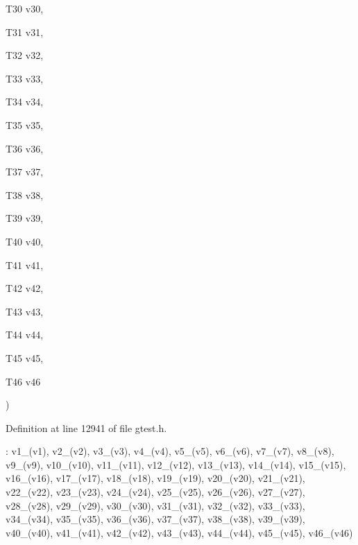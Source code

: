 {{\begin{DoxyParamCaption}
\item[{\-T30}]{v30, }
\item[{\-T31}]{v31, }
\item[{\-T32}]{v32, }
\item[{\-T33}]{v33, }
\item[{\-T34}]{v34, }
\item[{\-T35}]{v35, }
\item[{\-T36}]{v36, }
\item[{\-T37}]{v37, }
\item[{\-T38}]{v38, }
\item[{\-T39}]{v39, }
\item[{\-T40}]{v40, }
\item[{\-T41}]{v41, }
\item[{\-T42}]{v42, }
\item[{\-T43}]{v43, }
\item[{\-T44}]{v44, }
\item[{\-T45}]{v45, }
\item[{\-T46}]{v46}
\end{DoxyParamCaption}
)}}\label{d5/dac/classtesting_1_1internal_1_1ValueArray46_afcaa93628aeaf4917482a3c777e409ef}


\-Definition at line 12941 of file gtest.\-h.


\begin{DoxyCode}
                                                   : v1_(v1), v2_(v2), v3_(v3),
      v4_(v4), v5_(v5), v6_(v6), v7_(v7), v8_(v8), v9_(v9), v10_(v10),
      v11_(v11), v12_(v12), v13_(v13), v14_(v14), v15_(v15), v16_(v16),
      v17_(v17), v18_(v18), v19_(v19), v20_(v20), v21_(v21), v22_(v22),
      v23_(v23), v24_(v24), v25_(v25), v26_(v26), v27_(v27), v28_(v28),
      v29_(v29), v30_(v30), v31_(v31), v32_(v32), v33_(v33), v34_(v34),
      v35_(v35), v36_(v36), v37_(v37), v38_(v38), v39_(v39), v40_(v40),
      v41_(v41), v42_(v42), v43_(v43), v44_(v44), v45_(v45), v46_(v46) {}
\end{DoxyCode}


